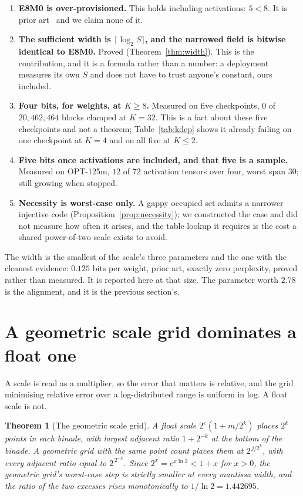 \documentclass[11pt]{article}
\newtheorem{theorem}{Theorem}
\theoremstyle{definition}
\begin{document}
\begin{enumerate}[leftmargin=*,itemsep=3pt]
\item \textbf{E8M0 is over-provisioned.} This holds including activations:
$5 < 8$. It is prior art~\cite{chhugani,mxgap} and we claim none of it.

\item \textbf{The sufficient width is $\lceil \log_2 S \rceil$, and the narrowed
field is bitwise identical to E8M0.} Proved (Theorem~\ref{thm:width}). This is
the contribution, and it is a formula rather than a number: a deployment
measures its own $S$ and does not have to trust anyone's constant, ours included.

\item \textbf{Four bits, for weights, at $K \ge 8$.} Measured on five
checkpoints, $0$ of $20{,}462{,}464$ blocks clamped at $K=32$. This is a fact
about these five checkpoints and not a theorem; Table~\ref{tab:kdep} shows it
already failing on one checkpoint at $K=4$ and on all five at $K \le 2$.

\item \textbf{Five bits once activations are included, and that five is a
sample.} Measured on OPT-125m, $12$ of $72$ activation tensors over four, worst
span $30$; still growing when stopped.

\item \textbf{Necessity is worst-case only.} A gappy occupied set admits a
narrower injective code (Proposition~\ref{prop:necessity}); we constructed the
case and did not measure how often it arises, and the table lookup it requires
is the cost a shared power-of-two scale exists to avoid.
\end{enumerate}

The width is the smallest of the scale's three parameters and the one with the
cleanest evidence: $0.125$ bits per weight, prior art, exactly zero perplexity,
proved rather than measured. It is reported here at that size. The parameter
worth $2.78$ is the alignment, and it is the previous section's.
\section{A geometric scale grid dominates a float one}\label{sec:geoscale}

A scale is read as a multiplier, so the error that matters is relative, and the
grid minimising relative error over a log-distributed range is uniform in log.
A float scale is not.

\begin{theorem}[The geometric scale grid]\label{thm:geoscale}
A float scale $2^{e}(1+m/2^{k})$ places $2^{k}$ points in each binade, with
largest adjacent ratio $1+2^{-k}$ at the bottom of the binade. A geometric grid
with the same point count places them at $2^{\,j/2^{k}}$, with every adjacent
ratio equal to $2^{\,2^{-k}}$. Since $2^{x}=e^{x\ln 2}<1+x$ for $x>0$, the
geometric grid's worst-case step is strictly smaller at every mantissa width,
and the ratio of the two excesses rises monotonically to $1/\ln 2 = 1.442695$.
\end{theorem}
\end{document}
